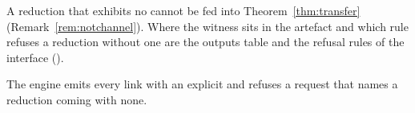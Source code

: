 
A reduction that exhibits no  cannot be fed into
Theorem~\ref{thm:transfer} (Remark~\ref{rem:notchannel}). Where the witness
sits in the artefact and which rule refuses a reduction without one are the
outputs table and the refusal rules of the interface
().

\begin{requirement}\label{req:channel-witness}
The engine emits every link with an explicit  and
refuses a request that names a reduction coming with none.
\end{requirement}
